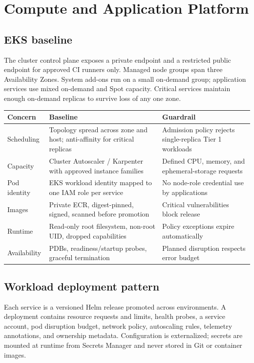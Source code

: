 \section{Compute and Application Platform}

\subsection{EKS baseline}

The cluster control plane exposes a private endpoint and a restricted public endpoint for approved CI runners only. Managed node groups span three Availability Zones. System add-ons run on a small on-demand group; application services use mixed on-demand and Spot capacity. Critical services maintain enough on-demand replicas to survive loss of any one zone.

\begin{tabularx}{\textwidth}{@{}L{32mm}Y Y@{}}
  \toprule
  \color{white}\textbf{Concern} & \color{white}\textbf{Baseline} & \color{white}\textbf{Guardrail} \\
  \midrule
  Scheduling & Topology spread across zone and host; anti-affinity for critical replicas & Admission policy rejects single-replica Tier 1 workloads \\
  Capacity & Cluster Autoscaler / Karpenter with approved instance families & Defined CPU, memory, and ephemeral-storage requests \\
  Pod identity & EKS workload identity mapped to one IAM role per service & No node-role credential use by applications \\
  Images & Private ECR, digest-pinned, signed, scanned before promotion & Critical vulnerabilities block release \\
  Runtime & Read-only root filesystem, non-root UID, dropped capabilities & Policy exceptions expire automatically \\
  Availability & PDBs, readiness/startup probes, graceful termination & Planned disruption respects error budget \\
  \bottomrule
\end{tabularx}

\subsection{Workload deployment pattern}

Each service is a versioned Helm release promoted across environments. A deployment contains resource requests and limits, health probes, a service account, pod disruption budget, network policy, autoscaling rules, telemetry annotations, and ownership metadata. Configuration is externalized; secrets are mounted at runtime from Secrets Manager and never stored in Git or container images.


